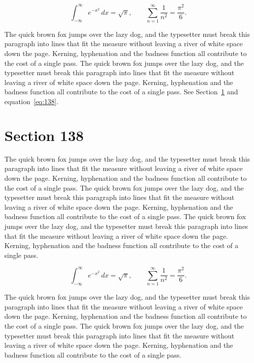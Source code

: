 \documentclass{article}
\begin{document}
\begin{equation}\label{eq:137}
\int_{-\infty}^{\infty} e^{-x^{2}}\,dx = \sqrt{\pi}, \qquad
\sum_{n=1}^{\infty} \frac{1}{n^{2}} = \frac{\pi^{2}}{6}.
\end{equation}

The quick brown fox jumps over the lazy dog, and the typesetter must break this paragraph into lines that fit the measure without leaving a river of white space down the page. Kerning, hyphenation and the badness function all contribute to the cost of a single pass. The quick brown fox jumps over the lazy dog, and the typesetter must break this paragraph into lines that fit the measure without leaving a river of white space down the page. Kerning, hyphenation and the badness function all contribute to the cost of a single pass. 
See Section~\ref{sec:138} and equation~\eqref{eq:138}.
\section{Section 138}
\label{sec:138}
The quick brown fox jumps over the lazy dog, and the typesetter must break this paragraph into lines that fit the measure without leaving a river of white space down the page. Kerning, hyphenation and the badness function all contribute to the cost of a single pass. The quick brown fox jumps over the lazy dog, and the typesetter must break this paragraph into lines that fit the measure without leaving a river of white space down the page. Kerning, hyphenation and the badness function all contribute to the cost of a single pass. The quick brown fox jumps over the lazy dog, and the typesetter must break this paragraph into lines that fit the measure without leaving a river of white space down the page. Kerning, hyphenation and the badness function all contribute to the cost of a single pass. 

\begin{equation}\label{eq:138}
\int_{-\infty}^{\infty} e^{-x^{2}}\,dx = \sqrt{\pi}, \qquad
\sum_{n=1}^{\infty} \frac{1}{n^{2}} = \frac{\pi^{2}}{6}.
\end{equation}

The quick brown fox jumps over the lazy dog, and the typesetter must break this paragraph into lines that fit the measure without leaving a river of white space down the page. Kerning, hyphenation and the badness function all contribute to the cost of a single pass. The quick brown fox jumps over the lazy dog, and the typesetter must break this paragraph into lines that fit the measure without leaving a river of white space down the page. Kerning, hyphenation and the badness function all contribute to the cost of a single pass. 
\end{document}
